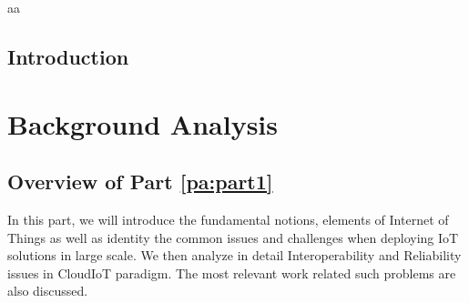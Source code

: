 \documentclass[a4paper,10pt,twoside]{ThesisStyle}
\begin{document}

aa 

\clearpage



\tableofcontents
\clearpage

\listoffigures
\clearpage
{}
\listoftables
\clearpage

{}

\clearpage

\mainmatter
\chapter{Introduction}
\label{intro}

\part{Background Analysis\label{pa:part1}}

\chapter*{Overview of Part \ref{pa:part1}}

In this part, we will introduce the fundamental notions, elements of Internet of Things as well as identity the common issues and challenges when deploying IoT solutions in large scale. We then analyze in detail Interoperability and Reliability issues in CloudIoT paradigm. The  most relevant work related such problems are also discussed.
\end{document}
